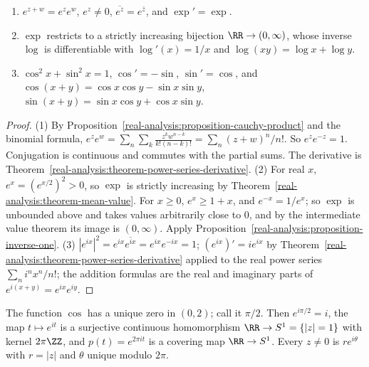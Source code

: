 \begin{proposition}\label{real-analysis:proposition-exponential}
\begin{enumerate}
\item $e^{z+w} = e^ze^w$, $e^z \neq 0$, $\overline{e^z} = e^{\bar z}$, and $\exp' = \exp$.
\item $\exp$ restricts to a strictly increasing bijection $\RR \to (0, \infty)$, whose inverse $\log$ is differentiable with $\log'(x) = 1/x$ and $\log(xy) = \log x + \log y$.
\item $\cos^2 x + \sin^2 x = 1$, $\cos' = -\sin$, $\sin' = \cos$, and $\cos(x + y) = \cos x\cos y - \sin x\sin y$, $\sin(x + y) = \sin x\cos y + \cos x\sin y$.
\end{enumerate}
\end{proposition}

\begin{proof}
(1) By Proposition~\ref{real-analysis:proposition-cauchy-product} and the binomial formula, $e^ze^w = \sum_n\sum_k\frac{z^kw^{n-k}}{k!(n-k)!} = \sum_n(z + w)^n/n!$. So $e^ze^{-z} = 1$. Conjugation is
continuous and commutes with the partial sums. The derivative is Theorem~\ref{real-analysis:theorem-power-series-derivative}. (2) For real $x$, $e^x = (e^{x/2})^2 > 0$, so $\exp$ is strictly
increasing by Theorem~\ref{real-analysis:theorem-mean-value}. For $x \geq 0$, $e^x \geq 1 + x$, and $e^{-x} = 1/e^x$; so $\exp$ is unbounded above and takes values arbitrarily close to $0$, and
by the intermediate value theorem its image is $(0, \infty)$. Apply Proposition~\ref{real-analysis:proposition-inverse-one}. (3) $|e^{ix}|^2 = e^{ix}\overline{e^{ix}} = e^{ix}e^{-ix} = 1$;
$(e^{ix})' = ie^{ix}$ by Theorem~\ref{real-analysis:theorem-power-series-derivative} applied to the real power series $\sum_n i^nx^n/n!$; the addition formulas are the real and imaginary parts of $e^{i(x+y)} = e^{ix}e^{iy}$.
\end{proof}

\begin{theorem}\label{real-analysis:theorem-pi}
The function $\cos$ has a unique zero in $(0, 2)$; call it $\pi/2$. Then $e^{i\pi/2} = i$, the map $t \mapsto e^{it}$ is a surjective continuous homomorphism $\RR \to S^1 = \{|z| = 1\}$ with kernel
$2\pi\ZZ$, and $p(t) = e^{2\pi it}$ is a covering map $\RR \to S^1$. Every $z \neq 0$ is $re^{i\theta}$ with $r = |z|$ and $\theta$ unique modulo $2\pi$.
\end{theorem}

